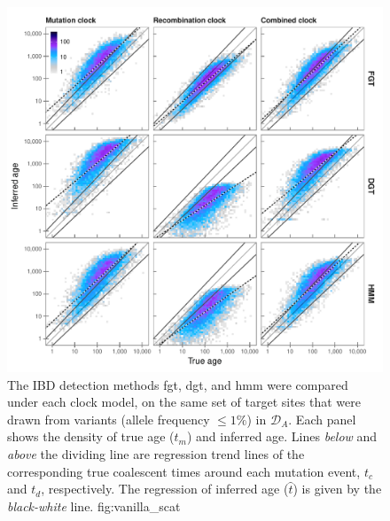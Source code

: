 

\begin{figure}[!htb]
\includegraphics[width=\textwidth]{./img/ch5/vanilla_scat}
{The  IBD detection methods \gls{fgt}, \gls{dgt}, and \gls{hmm} were compared under each clock model, on the same set of target sites that were drawn from \fk{[2,20]} variants (allele frequency ${\leq 1\%}$) in $\mathcal{D}_A$.
Each panel shows the density of true age ($t_m$) and inferred age.
Lines \emph{below} and \emph{above} the dividing line are regression trend lines of the corresponding true coalescent times around each mutation event, $t_c$ and $t_d$, respectively.
The regression of inferred age ($\hat{t}$) is given by the \emph{black-white} line.}
{fig:vanilla_scat}
\end{figure}
